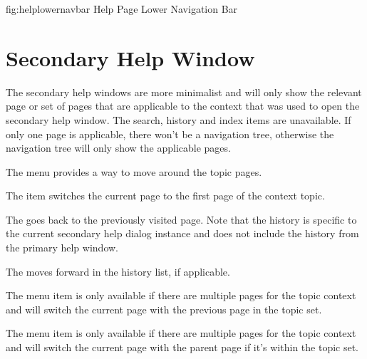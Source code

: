 \FloatFig
{fig:helplowernavbar}
{%
}
{Help Page Lower Navigation Bar}

\section{Secondary Help Window}
\label{sec:secondaryhelp}

The secondary help windows are more minimalist and will only show
the relevant page or set of pages that are applicable to the context
that was used to open the secondary help window. The search, history
and index items are unavailable. If only one page is applicable,
there won't be a navigation tree, otherwise the navigation tree will
only show the applicable pages.


The  menu provides a way to move around
the topic pages.


The  item switches the current
page to the first page of the context topic.


The  goes back to the
previously visited page. Note that the history is specific to the
current secondary help dialog instance and does not include the history
from the primary help window.


The  moves forward in the
history list, if applicable.


The  menu item is only
available if there are multiple pages for the topic context and will
switch the current page with the previous page in the topic set.


The  menu item is only
available if there are multiple pages for the topic context and will
switch the current page with the parent page if it's within the topic set.


